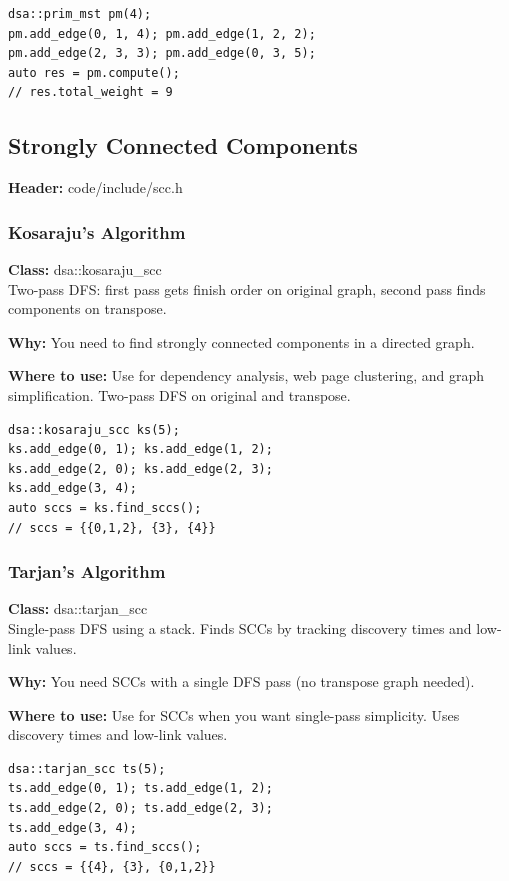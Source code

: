 \documentclass[11pt]{article}
\begin{document}
\begin{lstlisting}
dsa::prim_mst pm(4);
pm.add_edge(0, 1, 4); pm.add_edge(1, 2, 2);
pm.add_edge(2, 3, 3); pm.add_edge(0, 3, 5);
auto res = pm.compute();
// res.total_weight = 9
\end{lstlisting}

\subsection{Strongly Connected Components}
\textbf{Header:} code/include/scc.h

\subsubsection{Kosaraju's Algorithm}
\textbf{Class:} dsa::kosaraju\_scc\\

Two-pass DFS: first pass gets finish order on original graph, second pass finds components on transpose.

\textbf{Why:} You need to find strongly connected components in a directed graph. \par \textbf{Where to use:} Use for dependency analysis, web page clustering, and graph simplification. Two-pass DFS on original and transpose.

\begin{lstlisting}
dsa::kosaraju_scc ks(5);
ks.add_edge(0, 1); ks.add_edge(1, 2);
ks.add_edge(2, 0); ks.add_edge(2, 3);
ks.add_edge(3, 4);
auto sccs = ks.find_sccs();
// sccs = {{0,1,2}, {3}, {4}}
\end{lstlisting}

\subsubsection{Tarjan's Algorithm}
\textbf{Class:} dsa::tarjan\_scc\\

Single-pass DFS using a stack. Finds SCCs by tracking discovery times and low-link values.

\textbf{Why:} You need SCCs with a single DFS pass (no transpose graph needed). \par \textbf{Where to use:} Use for SCCs when you want single-pass simplicity. Uses discovery times and low-link values.

\begin{lstlisting}
dsa::tarjan_scc ts(5);
ts.add_edge(0, 1); ts.add_edge(1, 2);
ts.add_edge(2, 0); ts.add_edge(2, 3);
ts.add_edge(3, 4);
auto sccs = ts.find_sccs();
// sccs = {{4}, {3}, {0,1,2}}
\end{lstlisting}
\end{document}
